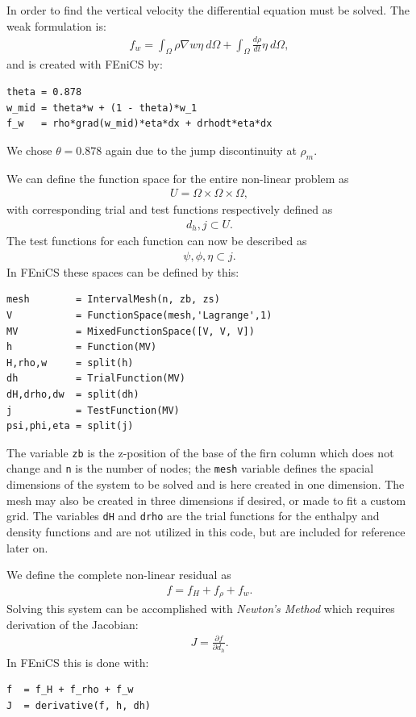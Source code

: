 \documentclass{article}%
\begin{document}
In order to find the vertical velocity the differential equation must be solved.  The weak formulation is:
\begin{align*}
  f_{w} = 
    \int_{\Omega} \rho \nabla{w} \eta\ d\Omega + \int_{\Omega} \frac{d\rho}{dt} \eta\ d\Omega,
\end{align*}
and is created with FEniCS by:
\footnotesize
\begin{verbatim}
theta = 0.878
w_mid = theta*w + (1 - theta)*w_1
f_w   = rho*grad(w_mid)*eta*dx + drhodt*eta*dx
\end{verbatim}
\normalsize
We chose $\theta=0.878$ again due to the jump discontinuity at $\rho_m$.

We can define the function space for the entire non-linear problem as 
\begin{align*}
    U = \Omega \times \Omega \times \Omega,
\end{align*}
with corresponding trial and test functions respectively defined as
\begin{align*}
    d_h, j \subset U.
\end{align*}
The test functions for each function can now be described as
\begin{align*}
    \psi, \phi, \eta \subset j.
\end{align*}
In FEniCS these spaces can be defined by this:
\footnotesize
\begin{verbatim}
mesh        = IntervalMesh(n, zb, zs)
V           = FunctionSpace(mesh,'Lagrange',1)
MV          = MixedFunctionSpace([V, V, V])
h           = Function(MV)
H,rho,w     = split(h)    
dh          = TrialFunction(MV)
dH,drho,dw  = split(dh)
j           = TestFunction(MV)
psi,phi,eta = split(j)
\end{verbatim}
\normalsize
The variable \texttt{zb} is the z-position of the base of the firn column which does not change and \texttt{n} is the number of nodes; the \texttt{mesh} variable defines the spacial dimensions of the system to be solved and is here created in one dimension.  The mesh may also be created in three dimensions if desired, or made to fit a custom grid.  The variables \texttt{dH} and \texttt{drho} are the trial functions for the enthalpy and density functions and are not utilized in this code, but are included for reference later on.

We define the complete non-linear residual as 
\begin{align*}
    f = f_H + f_{\rho} + f_w.
\end{align*}
Solving this system can be accomplished with \emph{Newton's Method} which requires derivation of the Jacobian:
\begin{align*}
    J = \frac{\partial f}{\partial d_h}.
\end{align*}
In FEniCS this is done with:
\footnotesize
\begin{verbatim}
f  = f_H + f_rho + f_w
J  = derivative(f, h, dh)
\end{verbatim}
\normalsize
\end{document}
